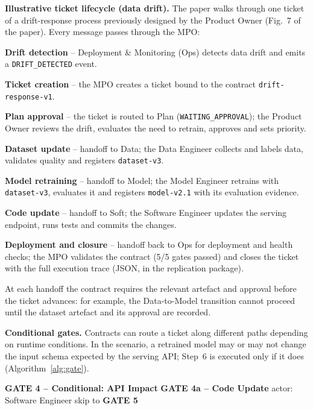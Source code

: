 \documentclass[11pt,a4paper]{article}
\begin{document}
\textbf{Illustrative ticket lifecycle (data drift).}
The paper walks through one ticket of a drift-response process previously designed by the Product Owner (Fig.~7 of the paper). Every message passes through the MPO:
\begin{description}[leftmargin=1.8cm,style=nextline]
  \item[Step 1.] \textbf{Drift detection} -- Deployment \& Monitoring (Ops) detects data drift and emits a \texttt{DRIFT\_DETECTED} event.
  \item[Step 2.] \textbf{Ticket creation} -- the MPO creates a ticket bound to the contract \texttt{drift-response-v1}.
  \item[Step 3.] \textbf{Plan approval} -- the ticket is routed to Plan (\texttt{WAITING\_APPROVAL}); the Product Owner reviews the drift, evaluates the need to retrain, approves and sets priority.
  \item[Step 4.] \textbf{Dataset update} -- handoff to Data; the Data Engineer collects and labels data, validates quality and registers \texttt{dataset-v3}.
  \item[Step 5.] \textbf{Model retraining} -- handoff to Model; the Model Engineer retrains with \texttt{dataset-v3}, evaluates it and registers \texttt{model-v2.1} with its evaluation evidence.
  \item[Step 6.] \textbf{Code update} -- handoff to Soft; the Software Engineer updates the serving endpoint, runs tests and commits the changes.
  \item[Step 7.] \textbf{Deployment and closure} -- handoff back to Ops for deployment and health checks; the MPO validates the contract (5/5 gates passed) and closes the ticket with the full execution trace (JSON, in the replication package).
\end{description}
At each handoff the contract requires the relevant artefact and approval before the ticket advances: for example, the Data-to-Model transition cannot proceed until the dataset artefact and its approval are recorded.

\textbf{Conditional gates.}
Contracts can route a ticket along different paths depending on runtime conditions. In the scenario, a retrained model may or may not change the input schema expected by the serving API; Step~6 is executed only if it does (Algorithm~\ref{alg:gate}).

\begin{algorithm}[h]
\caption{Conditional gate in the drift-response contract (from~\cite{daoud2026}).}\label{alg:gate}
\begin{algorithmic}[1]
\State \textbf{GATE 4 -- Conditional: API Impact}
  \State \textbf{GATE 4a -- Code Update}
  \State actor: Software Engineer
\Else
  \State skip to \textbf{GATE 5}
\EndIf
\end{algorithmic}
\end{algorithm}
\end{document}

